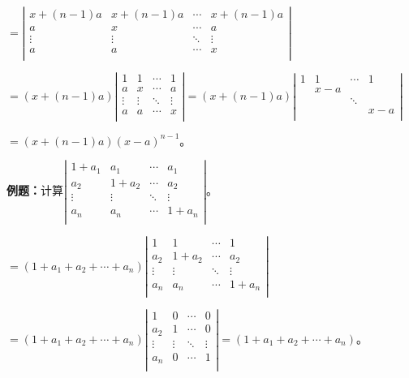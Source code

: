 \documentclass[UTF8, 12pt]{ctexart}
\begin{document}
$=\left|\begin{array}{cccc} 
    x+(n-1)a & x+(n-1)a & \cdots & x+(n-1)a \\
    a & x & \cdots & a \\
    \vdots & \vdots & \ddots & \vdots \\
    a & a & \cdots & x \\
\end{array}\right|$

$=(x+(n-1)a)\left|\begin{array}{cccc} 
    1 & 1 & \cdots & 1 \\
    a & x & \cdots & a \\
    \vdots & \vdots & \ddots & \vdots \\
    a & a & \cdots & x \\
\end{array}\right|=(x+(n-1)a)\left|\begin{array}{cccc} 
    1 & 1 & \cdots & 1 \\
     & x-a & &  \\
     & & \ddots & \\
     & & & x-a \\
\end{array}\right|$

$=(x+(n-1)a)(x-a)^{n-1}$。

\textbf{例题：}计算$\left|\begin{array}{cccc} 
    1+a_1 & a_1 & \cdots & a_1 \\
    a_2 & 1+a_2 & \cdots & a_2 \\
    \vdots & \vdots & \ddots & \vdots \\
    a_n & a_n & \cdots & 1+a_n \\
\end{array}\right|$。

$=(1+a_1+a_2+\cdots+a_n)\left|\begin{array}{cccc} 
    1 & 1 & \cdots & 1 \\
    a_2 & 1+a_2 & \cdots & a_2 \\
    \vdots & \vdots & \ddots & \vdots \\
    a_n & a_n & \cdots & 1+a_n \\
\end{array}\right|$

$=(1+a_1+a_2+\cdots+a_n)\left|\begin{array}{cccc} 
    1 & 0 & \cdots & 0 \\
    a_2 & 1 & \cdots & 0 \\
    \vdots & \vdots & \ddots & \vdots \\
    a_n & 0 & \cdots & 1 \\
\end{array}\right|=(1+a_1+a_2+\cdots+a_n)$。
\end{document}
